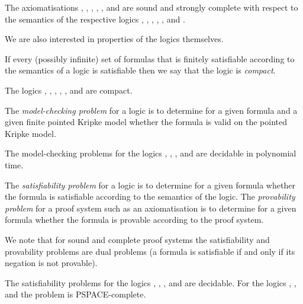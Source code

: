 \begin{proposition}
The axiomatisations \axiomK{}, \axiomKF{}, \axiomKFF{}, \axiomKD{}, \axiomSF{}, and \axiomS{} are sound and strongly complete with respect to the semantics of the respective logics \logicK{}, \logicKF{}, \logicKFF{}, \logicKD{}, \logicSF{}, and \logicS{}.
\end{proposition}

We are also interested in properties of the logics themselves.

\begin{definition}[Compactness]
If every (possibly infinite) set of formulas that is finitely satisfiable according to the semantics of a logic is satisfiable then we say that the logic is {\em compact}.
\end{definition}

\begin{proposition}
The logics \logicK{}, \logicKF{}, \logicKFF{}, \logicKD{}, \logicSF{}, and \logicS{} are compact.
\end{proposition}

\begin{definition}
The {\em model-checking problem} for a logic is to determine for a given formula and a given finite pointed Kripke model whether the formula is valid on the pointed Kripke model.
\end{definition}

\begin{proposition}
The model-checking problems for the logics \logicK{}, \logicKF{}, \logicKFF{}, \logicKD{} and \logicS{} are decidable in polynomial time.
\end{proposition}

\begin{definition}
The {\em satisfiability problem} for a logic is to determine for a given formula whether the formula is satisfiable according to the semantics of the logic.
The {\em provability problem} for a proof system such as an axiomatisation is to determine for a given formula whether the formula is provable according to the proof system.
\end{definition}

We note that for sound and complete proof systems the satisfiability and provability problems are dual problems (a formula is satisfiable if and only if its negation is not provable).

\begin{proposition}
The satisfiability problems for the logics \logicK{}, \logicKF{}, \logicKFF{}, \logicKD{} and \logicS{} are decidable.
For the logics \logicK{}, \logicKFF{}, \logicKD{} and \logicS{} the problem is PSPACE-complete. 
\end{proposition}

